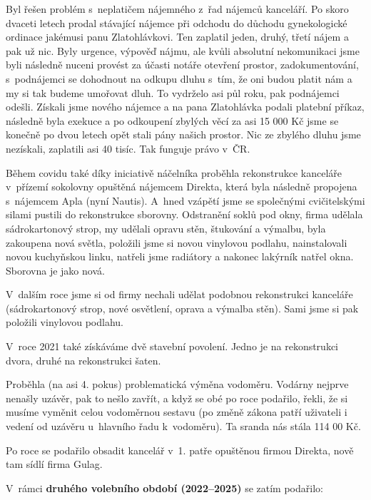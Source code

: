 \documentclass[11pt]{article}
\begin{document}
Byl řešen problém s~neplatičem nájemného z~řad nájemců kanceláří. Po skoro dvaceti letech prodal stávající nájemce při odchodu do důchodu gynekologické ordinace jakémusi panu Zlatohlávkovi. Ten zaplatil jeden, druhý, třetí nájem a pak už nic. Byly urgence, výpověď nájmu, ale kvůli absolutní nekomunikaci jsme byli následně nuceni provést za účasti notáře otevření prostor, zadokumentování, s~podnájemci se dohodnout na odkupu dluhu s~tím, že oni budou platit nám a my si tak budeme umořovat dluh. To vydrželo asi půl roku, pak podnájemci odešli. Získali jsme nového nájemce a na pana Zlatohlávka podali platební příkaz, následně byla exekuce a po odkoupení zbylých věcí za asi 15 000 Kč jsme se konečně po dvou letech opět stali pány našich prostor. Nic ze zbylého dluhu jsme nezískali, zaplatili asi 40 tisíc. Tak funguje právo v~ČR.

Během covidu také díky iniciativě náčelníka proběhla rekonstrukce kanceláře v~přízemí sokolovny opuštěná nájemcem Direkta, která byla následně propojena s~nájemcem Apla (nyní Nautis). A~hned vzápětí jsme se společnými cvičitelskými silami pustili do rekonstrukce sborovny. Odstranění soklů pod okny, firma udělala sádrokartonový strop, my udělali opravu stěn, štukování a výmalbu, byla zakoupena nová světla, položili jsme si novou vinylovou podlahu, nainstalovali novou kuchyňskou linku, natřeli jsme radiátory a nakonec lakýrník natřel okna. Sborovna je jako nová.

V~dalším roce jsme si od firmy nechali udělat podobnou rekonstrukci kanceláře (sádrokartonový strop, nové osvětlení, oprava a výmalba stěn). Sami jsme si pak položili vinylovou podlahu.

V~roce 2021 také získáváme dvě stavební povolení. Jedno je na rekonstrukci dvora, druhé na rekonstrukci šaten.

Proběhla (na asi 4. pokus) problematická výměna vodoměru. Vodárny nejprve nenašly uzávěr, pak to nešlo zavřít, a když se obé po roce podařilo, řekli, že si musíme vyměnit celou vodoměrnou sestavu (po změně zákona patří uživateli i vedení od uzávěru u~hlavního řadu k~vodoměru). Ta sranda nás stála 114 00 Kč.

Po roce se podařilo obsadit kancelář v~1. patře opuštěnou firmou Direkta, nově tam sídlí firma Gulag.


V~rámci \textbf{druhého volebního období (2022–2025)} se zatím podařilo: 
\end{document}
